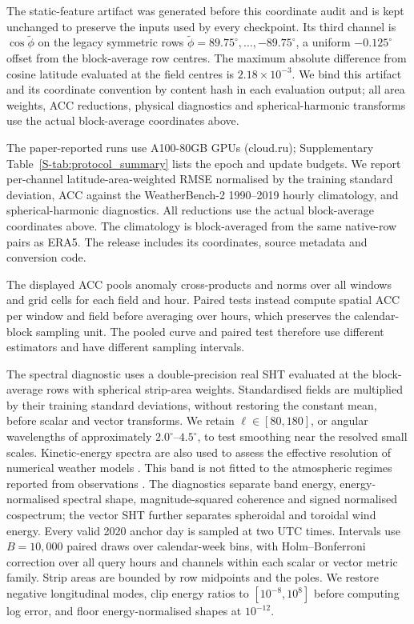 \documentclass[referee,lineno,pdflatex,sn-nature]{sn-jnl}
\begin{document}
\begin{deferredmethodsrest}
The static-feature artifact was generated before this coordinate audit and is
kept unchanged to preserve the inputs used by every checkpoint. Its third
channel is $\cos\tilde\phi$ on the legacy symmetric rows
$\tilde\phi=89.75^\circ,\ldots,-89.75^\circ$, a uniform
$-0.125^\circ$ offset from the block-average row centres. The maximum absolute
difference from cosine latitude evaluated at the field centres is
$2.18\times10^{-3}$. We bind this artifact and its coordinate convention by
content hash in each evaluation output; all area weights, ACC reductions,
physical diagnostics and spherical-harmonic transforms use the actual
block-average coordinates above.

The paper-reported runs use A100-80GB GPUs (cloud.ru); Supplementary
Table~\ref{S-tab:protocol_summary} lists the epoch and update budgets. We report per-channel
latitude-area-weighted RMSE normalised by the training standard deviation, ACC
against the WeatherBench-2 1990--2019 hourly climatology, and
spherical-harmonic diagnostics. All reductions use the actual block-average
coordinates above. The climatology is block-averaged from the same native-row
pairs as ERA5. The release includes its coordinates, source metadata and
conversion code.

The displayed ACC pools anomaly cross-products and norms over all windows and
grid cells for each field and hour. Paired tests instead compute spatial ACC
per window and field before averaging over hours, which preserves the
calendar-block sampling unit. The pooled curve and paired test therefore use
different estimators and have different sampling intervals.

The spectral diagnostic uses a double-precision real SHT evaluated at the
block-average rows with spherical strip-area weights. Standardised fields are
multiplied by their training standard deviations, without restoring the
constant mean, before scalar and vector transforms. We retain
$\ell\in[80,180]$, or angular wavelengths of approximately
$2.0^\circ$--$4.5^\circ$, to test smoothing near the resolved small scales.
Kinetic-energy spectra are also used to assess the effective resolution of
numerical weather models \cite{skamarock2004}.
This band is not fitted to the atmospheric regimes reported from observations
\cite{nastrom1985climatology,lindborg1999can}. The diagnostics separate band
energy, energy-normalised spectral shape, magnitude-squared coherence and
signed normalised cospectrum; the vector SHT further separates spheroidal and
toroidal wind energy. Every valid 2020 anchor day is sampled at two UTC times.
Intervals use $B{=}10{,}000$ paired draws over calendar-week bins, with
Holm--Bonferroni correction over all query hours and channels within each
scalar or vector metric family. Strip areas are bounded by row midpoints and
the poles. We restore negative longitudinal modes, clip energy ratios to
$[10^{-8},10^8]$ before computing log error, and floor energy-normalised
shapes at $10^{-12}$.


\end{deferredmethodsrest}
\end{document}
